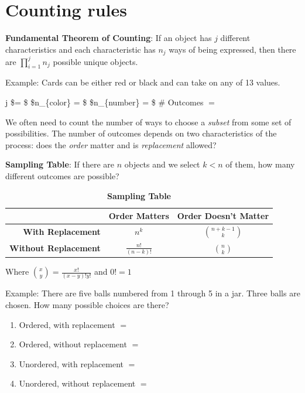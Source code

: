 \documentclass[]{book}
\providecommand{\tightlist}{%
  \setlength{\itemsep}{0pt}\setlength{\parskip}{0pt}}
\theoremstyle{definition}
\theoremstyle{definition}
\theoremstyle{definition}
\theoremstyle{remark}
\begin{document}
\section{Counting rules}\label{counting-rules}

\textbf{Fundamental Theorem of Counting}: If an object has \(j\)
different characteristics and each characteristic has \(n_j\) ways of
being expressed, then there are \(\prod_{i = 1}^j n_j\) possible unique
objects.

Example: Cards can be either red or black and can take on any of 13
values.

j \$= \$ \hspace{1.5cm} \$n\_\{color\} = \$ \hspace{1.5cm}
\$n\_\{number\} = \$ \hspace{1.5cm} \# Outcomes \(=\)

We often need to count the number of ways to choose a \textit{subset}
from some set of possibilities. The number of outcomes depends on two
characteristics of the process: does the \emph{order} matter and is
\emph{replacement} allowed?

\textbf{Sampling Table}: If there are \(n\) objects and we select
\(k < n\) of them, how many different outcomes are possible?

\begin{table}[h!]
\begin{center}
\caption*{\textbf{Sampling Table}}
\begin{tabular}{|r|c|c|}
\hline
& \textbf{Order Matters} & \textbf{Order Doesn't Matter}\\
\hline
\textbf{With Replacement} & $n^k$ & $\binom{n+k-1}{k}$\\
\hline
\textbf{Without Replacement} & $ \frac{n!}{(n-k)!}$ & $\binom{n}{k}$\\
\hline
\end{tabular}
\end{center}
\end{table}

Where \(\binom{x}{y} = \frac{x!}{(x-y)!y!}\) and \(0! = 1\)

Example: There are five balls numbered from 1 through 5 in a jar. Three
balls are chosen. How many possible choices are there?

\begin{enumerate}
\def\labelenumi{\arabic{enumi}.}
\tightlist
\item
  Ordered, with replacement \(=\)
\item
  Ordered, without replacement \(=\)
\item
  Unordered, with replacement \(=\)
\item
  Unordered, without replacement \(=\)
\end{enumerate}
\end{document}
